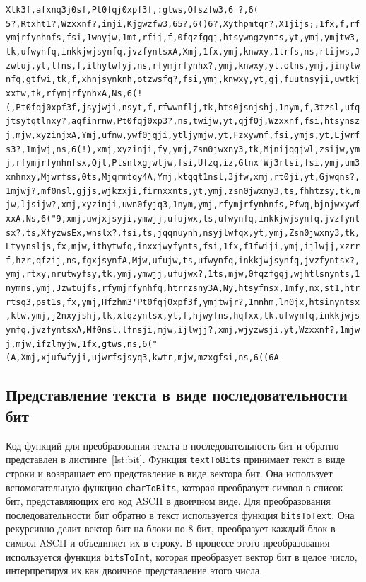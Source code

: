 \documentclass[11pt,a4paper,final]{article} %
\begin{document}
\lstinline[stringstyle=\color{black}]|Xtk3f,afxnq3j0sf,Pt0fqj0xpf3f,:gtws,Ofszfw3,6 ?,6( 5?,Rtxht1?,Wzxxnf?,inji,Kjgwzfw3,65?,6()6?,Xythpmtqr?,X1jijs;,1fx,f,rfymjrfynhnfs,fsi,1wnyjw,1mt,rfij,f,0fqzfgqj,htsywngzynts,yt,ymj,ymjtw3,tk,ufwynfq,inkkjwjsynfq,jvzfyntsxA,Xmj,1fx,ymj,knwxy,1trfs,ns,rtijws,Jzwtuj,yt,lfns,f,ithytwfyj,ns,rfymjrfynhx?,ymj,knwxy,yt,otns,ymj,jinytwnfq,gtfwi,tk,f,xhnjsynknh,otzwsfq?,fsi,ymj,knwxy,yt,gj,fuutnsyji,uwtkjxxtw,tk,rfymjrfynhxA,Ns,6(!(,Pt0fqj0xpf3f,jsyjwji,nsyt,f,rfwwnflj,tk,hts0jsnjshj,1nym,f,3tzsl,ufqjtsytqtlnxy?,aqfinrnw,Pt0fqj0xp3?,ns,twijw,yt,qjf0j,Wzxxnf,fsi,htsynszj,mjw,xyzinjxA,Ymj,ufnw,ywf0jqji,ytljymjw,yt,Fzxywnf,fsi,ymjs,yt,Ljwrfs3?,1mjwj,ns,6(!),xmj,xyzinji,fy,ymj,Zsn0jwxny3,tk,Mjnijqgjwl,zsijw,ymj,rfymjrfynhnfsx,Qjt,Ptsnlxgjwljw,fsi,Ufzq,iz,Gtnx'Wj3rtsi,fsi,ymj,um3xnhnxy,Mjwrfss,0ts,Mjqrmtqy4A,Ymj,ktqqt1nsl,3jfw,xmj,rt0ji,yt,Gjwqns?,1mjwj?,mf0nsl,gjjs,wjkzxji,firnxxnts,yt,ymj,zsn0jwxny3,ts,fhhtzsy,tk,mjw,ljsijw?,xmj,xyzinji,uwn0fyjq3,1nym,ymj,rfymjrfynhnfs,Pfwq,bjnjwxywfxxA,Ns,6("9,xmj,uwjxjsyji,ymwjj,ufujwx,ts,ufwynfq,inkkjwjsynfq,jvzfyntsx?,ts,XfyzwsEx,wnslx?,fsi,ts,jqqnuynh,nsyjlwfqx,yt,ymj,Zsn0jwxny3,tk,Ltyynsljs,fx,mjw,ithytwfq,inxxjwyfynts,fsi,1fx,f1fwiji,ymj,ijlwjj,xzrrf,hzr,qfzij,ns,fgxjsynfA,Mjw,ufujw,ts,ufwynfq,inkkjwjsynfq,jvzfyntsx?,ymj,rtxy,nrutwyfsy,tk,ymj,ymwjj,ufujwx?,1ts,mjw,0fqzfgqj,wjhtlsnynts,1nymns,ymj,Jzwtujfs,rfymjrfynhfq,htrrzsny3A,Ny,htsyfnsx,1mfy,nx,st1,htrrtsq3,pst1s,fx,ymj,Hfzhm3'Pt0fqj0xpf3f,ymjtwjr?,1mnhm,ln0jx,htsinyntsx,ktw,ymj,j2nxyjshj,tk,xtqzyntsx,yt,f,hjwyfns,hqfxx,tk,ufwynfq,inkkjwjsynfq,jvzfyntsxA,Mf0nsl,lfnsji,mjw,ijlwjj?,xmj,wjyzwsji,yt,Wzxxnf?,1mjwj,mjw,ifzlmyjw,1fx,gtws,ns,6("(A,Xmj,xjufwfyji,ujwrfsjsyq3,kwtr,mjw,mzxgfsi,ns,6((6A|


\subsection{Представление текста в виде последовательности бит}

Код функций для преобразования текста в последовательность бит и обратно представлен в листинге~\ref{lst:bit}. Функция \texttt{textToBits} принимает текст в виде строки и возвращает его представление в виде вектора бит. Она использует вспомогательную функцию \texttt{charToBits}, которая преобразует символ в список бит, представляющих его код ASCII в двоичном виде. Для преобразования последовательности бит обратно в текст используется функция \texttt{bitsToText}. Она рекурсивно делит вектор бит на блоки по 8 бит, преобразует каждый блок в символ ASCII и объединяет их в строку. В процессе этого преобразования используется функция \texttt{bitsToInt}, которая преобразует вектор бит в целое число, интерпретируя их как двоичное представление этого числа.
\end{document}

